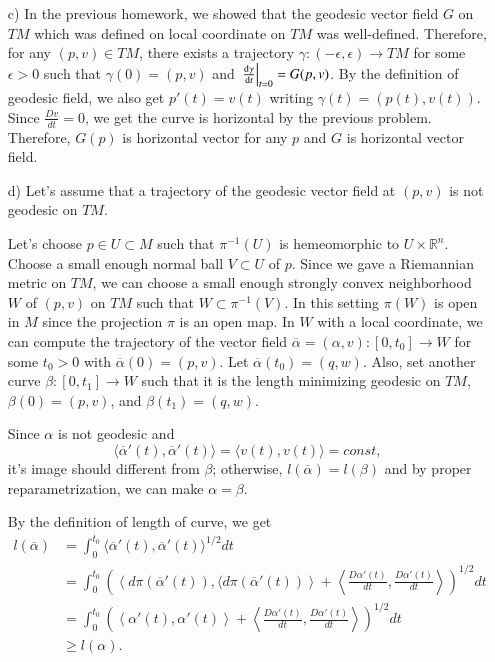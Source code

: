\documentclass[a4paper, 12pt]{article}
\theoremstyle{Mydefinition}
\theoremstyle{Mytheorem}
\begin{document}
\begin{enumerate}
\begin{enumerate}
        \item[c)] In the previous homework, we showed that the geodesic vector field $G$ on $TM$ which was defined on local coordinate on $TM$ was well-defined. Therefore, for any $(p,v)\in TM$, there exists a trajectory $\gamma:(-\epsilon, \epsilon)\rightarrow TM$ for some $\epsilon>0$ such that $\gamma(0) = (p,v)$ and $\left.\dv{\gamma}{t}\right|_{t=0} = G(p,v)$. By the definition of geodesic field, we also get $p'(t) = v(t)$ writing $\gamma(t) = (p(t), v(t))$. Since $\frac{D v}{dt} = 0$, we get the curve is horizontal by the previous problem. Therefore, $G(p)$ is horizontal vector for any $p$ and $G$ is horizontal vector field.
        
        \item[d)] Let's assume that a trajectory of the geodesic vector field at $(p,v)$ is not geodesic on $TM$.
        
        Let's choose $p\in U\subset M$ such that $\pi^{-1}(U)$ is hemeomorphic to $U\times\mathbb{R}^n$. Choose a small enough normal ball $V\subset U$ of $p$. Since we gave a Riemannian metric on $TM$, we can choose a small enough strongly convex neighborhood $W$ of $(p,v)$ on $TM$ such that $W\subset \pi^{-1}(V)$. In this setting $\pi(W)$ is open in $M$ since the projection $\pi$ is an open map. In $W$ with a local coordinate, we can compute the trajectory of the vector field $\overline{\alpha}=(\alpha, v):[0,t_0]\rightarrow W$ for some $t_0>0$ with $\overline{\alpha}(0) = (p,v)$. Let $\overline{\alpha}(t_0) = (q,w)$. Also, set another curve $\beta:[0, t_1]\rightarrow W$ such that it is the length minimizing geodesic on $TM$, $\beta(0) = (p,v)$, and $\beta(t_1) = (q,w)$. 
        
        Since $\alpha$ is not geodesic and 
        \begin{equation}
            \langle \overline{\alpha}'(t), \overline{\alpha}'(t)\rangle = \langle v(t), v(t)\rangle = const,
        \end{equation}
        it's image should different from $\beta$; otherwise, $l(\overline{\alpha}) = l(\beta)$ and by proper reparametrization, we can make $\alpha = \beta$.
        
        By the definition of length of curve, we get
        \begin{equation}
        \begin{split}
            l(\overline{\alpha}) &=\int_0^{t_0}\langle \overline{\alpha}'(t), \overline{\alpha}'(t)\rangle^{1/2}dt \\
            &=\int_0^{t_0}\left(\left\langle d\pi(\overline{\alpha}'(t)), \langle d\pi(\overline{\alpha}'(t))\right\rangle + \left\langle \frac{D\alpha'(t)}{dt}, \frac{D\alpha'(t)}{dt}\right\rangle \right)^{1/2}dt\\
            &=\int_0^{t_0}\left(\left\langle \alpha'(t), \alpha'(t)\right\rangle + \left\langle \frac{D\alpha'(t)}{dt}, \frac{D\alpha'(t)}{dt}\right\rangle \right)^{1/2}dt\\
            &\geq l(\alpha).
        \end{split}
        \end{equation}
        

\end{enumerate}
\end{enumerate}
\end{document}
